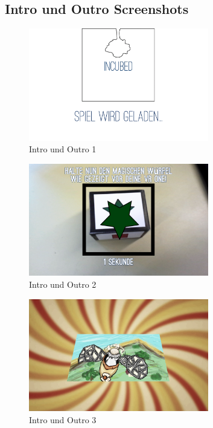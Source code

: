 \subsection{Intro und Outro Screenshots} \label{Intro}

\begin{figure}[!htbp]%
	\centering
		\includegraphics[width=0.7\textwidth]{images/Intro_1}
	\caption{Intro und Outro 1}
	\label{fig:Intro}
\end{figure}

\begin{figure}[!htbp]%
	\centering
		\includegraphics[width=0.7\textwidth]{images/Intro_2}
	\caption{Intro und Outro 2}
	\label{fig:Intro}
\end{figure}

\begin{figure}[!htbp]%
	\centering
		\includegraphics[width=0.7\textwidth]{images/Intro_3}
	\caption{Intro und Outro 3}
	\label{fig:Intro}
\end{figure}

